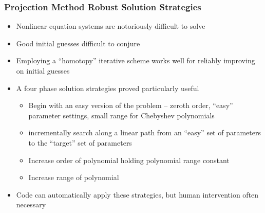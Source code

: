 \documentclass[tikz]{beamer}
\begin{document}
\begin{frame}
\frametitle{Projection Method Robust Solution Strategies}
\begin{itemize}
\item Nonlinear equation systems are notoriously difficult to solve
\item Good initial guesses difficult to conjure
\item Employing a ``homotopy'' iterative scheme works well for
  reliably improving on initial guesses
\item A four phase solution strategies proved particularly useful
  \begin{itemize}
  \item Begin with an easy version of the problem -- zeroth order,
    ``easy'' parameter settings, small range for Chebyshev polynomials
  \item incrementally search along a linear path from an ``easy'' set
    of parameters to the ``target'' set of parameters
  \item Increase order of polynomial holding polynomial range constant
  \item Increase range of polynomial
  \end{itemize}
\item Code can automatically apply these strategies, but human
  intervention often necessary
\end{itemize}









\end{frame}
\end{document}
